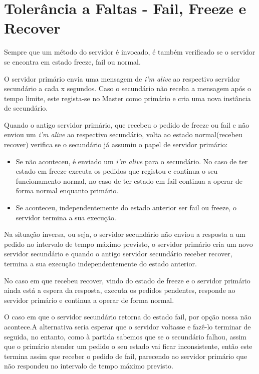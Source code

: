 \section{Tolerância a Faltas - Fail, Freeze e Recover}

Sempre que um método do servidor é invocado, é também verificado se o servidor se encontra em estado freeze, fail ou normal.

O servidor primário envia uma mensagem de \textit{i’m alive} ao respectivo servidor secundário a cada x segundos. Caso o secundário não receba a mensagem após o tempo limite, este regista-se no Master como primário e cria uma nova instância de secundário.

Quando o antigo servidor primário, que recebeu o pedido de freeze ou fail e não enviou um \textit{i’m alive} ao respectivo secundário, volta ao estado normal(recebeu recover) verifica se o secundário já assumiu o papel de servidor primário:
\begin{itemize}
\item Se não aconteceu, é enviado um \textit{i’m alive} para o secundário. No caso de ter estado em freeze executa os pedidos que registou e continua o seu funcionamento normal, no caso de ter estado em fail continua a operar de forma normal enquanto primário.
\item Se aconteceu, independentemente do estado anterior ser fail ou freeze, o servidor termina a sua execução.
\end{itemize}
Na situação inversa, ou seja, o servidor secundário não enviou a resposta a um pedido no intervalo de tempo máximo previsto, o servidor primário cria um novo servidor secundário e quando o antigo servidor secundário receber recover, termina a sua execução independentemente do estado anterior. 

No caso em que recebeu recover, vindo do estado de freeze e o servidor primário ainda está a espera da resposta, executa os pedidos pendentes, responde ao servidor primário e continua a operar de forma normal. 

O caso em que o servidor secundário retorna do estado fail, por opção nossa não acontece.A alternativa seria esperar que o servidor voltasse e fazê-lo terminar de seguida, no entanto, como à partida sabemos que se o secundário falhou, assim que o primário atender um pedido o seu estado vai ficar inconsistente, então este termina assim que receber o pedido de fail, parecendo ao servidor primário que não respondeu no intervalo de tempo máximo previsto.

